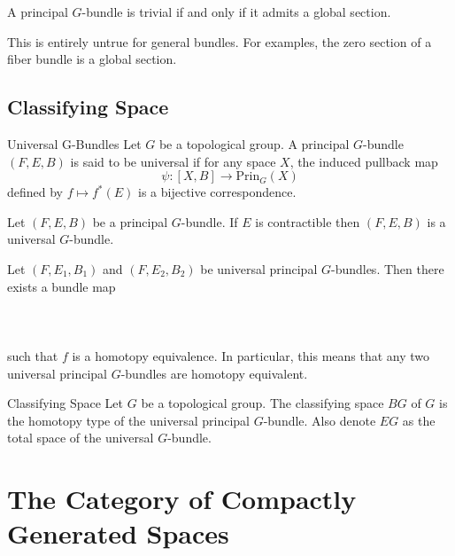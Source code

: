 \documentclass[a4paper]{article}
\begin{document}
\begin{thm}{}{} A principal $G$-bundle is trivial if and only if it admits a global section. 
\end{thm}

This is entirely untrue for general bundles. For examples, the zero section of a fiber bundle is a global section. 

\subsection{Classifying Space}
\begin{defn}{Universal G-Bundles}{} Let $G$ be a topological group. A principal $G$-bundle $(F,E,B)$ is said to be universal if for any space $X$, the induced pullback map $$\psi:[X,B]\to\text{Prin}_G(X)$$ defined by $f\mapsto f^\ast(E)$ is a bijective correspondence. 
\end{defn}

\begin{thm}{}{} Let $(F,E,B)$ be a principal $G$-bundle. If $E$ is contractible then $(F,E,B)$ is a universal $G$-bundle. 
\end{thm}

\begin{thm}{}{} Let $(F,E_1,B_1)$ and $(F,E_2,B_2)$ be universal principal $G$-bundles. Then there exists a bundle map \\~\\
\\~\\
such that $f$ is a homotopy equivalence. In particular, this means that any two universal principal $G$-bundles are homotopy equivalent. 
\end{thm}

\begin{defn}{Classifying Space}{} Let $G$ be a topological group. The classifying space $BG$ of $G$ is the homotopy type of the universal principal $G$-bundle. Also denote $EG$ as the total space of the universal $G$-bundle. 
\end{defn}

\pagebreak
\section{The Category of Compactly Generated Spaces}
\end{document}
